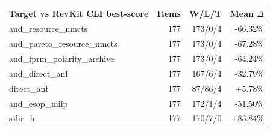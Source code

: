 \begin{tabular}{lrrr}
\toprule
Target vs RevKit CLI best-score & Items & W/L/T & Mean $\Delta$ \\
\midrule
and\_resource\_nmcts & 177 & 173/0/4 & -66.32\% \\
and\_pareto\_resource\_nmcts & 177 & 173/0/4 & -67.28\% \\
and\_fprm\_polarity\_archive & 177 & 173/0/4 & -64.24\% \\
and\_direct\_anf & 177 & 167/6/4 & -32.79\% \\
direct\_anf & 177 & 87/86/4 & +5.78\% \\
and\_esop\_milp & 177 & 172/1/4 & -51.50\% \\
sshr\_h & 177 & 170/7/0 & +83.84\% \\
\bottomrule
\end{tabular}
